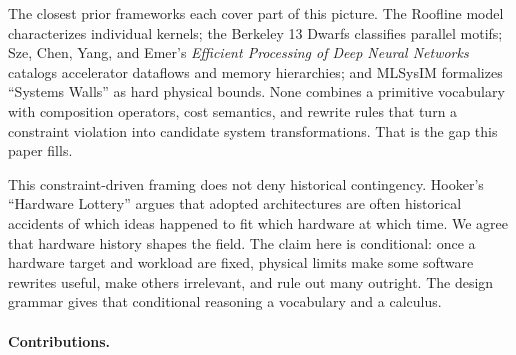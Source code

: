 \documentclass[10pt,twocolumn]{article}
\begin{document}
The closest prior frameworks each cover part of this picture. The Roofline model \citep{williams2009} characterizes individual kernels; the Berkeley 13 Dwarfs \citep{asanovic2006landscape} classifies parallel motifs; Sze, Chen, Yang, and Emer's \emph{Efficient Processing of Deep Neural Networks} \citep{sze2020} catalogs accelerator dataflows and memory hierarchies; and MLSysIM \citep{reddi2026mlsysim} formalizes ``Systems Walls'' as hard physical bounds. None combines a primitive vocabulary with composition operators, cost semantics, and rewrite rules that turn a constraint violation into candidate system transformations. That is the gap this paper fills.

This constraint-driven framing does not deny historical contingency. Hooker's ``Hardware Lottery'' \citep{hooker2020hardware} argues that adopted architectures are often historical accidents of which ideas happened to fit which hardware at which time. We agree that hardware history shapes the field. The claim here is conditional: once a hardware target and workload are fixed, physical limits make some software rewrites useful, make others irrelevant, and rule out many outright. The design grammar gives that conditional reasoning a vocabulary and a calculus.

\paragraph{Contributions.}
\end{document}
